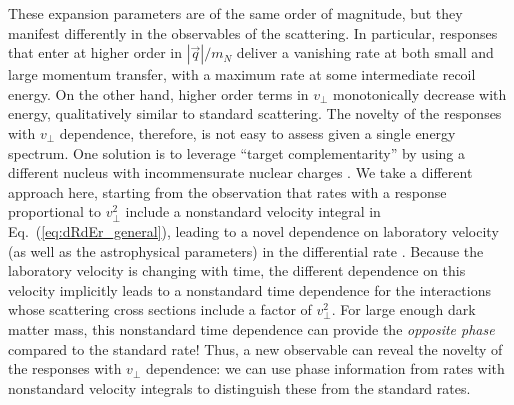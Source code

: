 \documentclass[11pt]{article}
\newcommand{\Eq}[1]{Eq.~(\ref{#1})} \newcommand{\Eqs}[2]{Eqs.~(\ref{#1}) and (\ref{#2})} \newcommand{\Eqm}[2]{Eqs.~(\ref{#1}) through (\ref{#2})}
\begin{document}
These expansion parameters are of the same order of magnitude, but they manifest differently in the observables of the scattering. In particular, responses that enter at higher order in $|\vec q|/m_N$ deliver a vanishing rate at both small and large momentum transfer, with a maximum rate at some intermediate recoil energy. On the other hand, higher order terms in $v_\perp$ monotonically decrease with energy, qualitatively similar to standard scattering. The novelty of the responses with $v_\perp$ dependence, therefore, is not easy to assess given a single energy spectrum. One solution is to leverage ``target complementarity'' by using a different nucleus with incommensurate nuclear charges \cite{Gluscevic:2015sqa}. We take a different approach here, starting from the observation that rates with a response proportional to $v_\perp^2$ include a nonstandard velocity integral in \Eq{eq:dRdEr_general}, leading to a novel dependence on laboratory velocity (as well as the astrophysical parameters) in the differential rate \cite{Fitzpatrick:2010br}. Because the laboratory velocity is changing with time, the different dependence on this velocity implicitly leads to a nonstandard time dependence for the interactions whose scattering cross sections include a factor of $v_\perp^2$. For large enough dark matter mass, this nonstandard time dependence can provide the {\it opposite phase} compared to the standard rate! Thus, a new observable can reveal the novelty of the responses with $v_\perp$ dependence: we can use phase information from rates with nonstandard velocity integrals to distinguish these from the standard rates.

\end{document}
